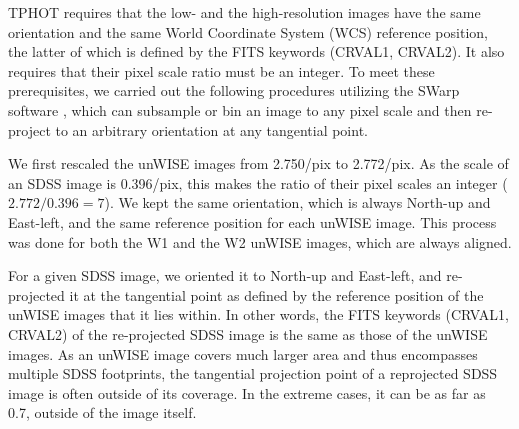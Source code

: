 \documentclass[numberedappendix,apj,twocolumn]{emulateapj}
\begin{document}

TPHOT requires that the low- and the high-resolution images have the same orientation and the same World Coordinate System (WCS) reference position, the latter of which is defined by the FITS keywords (CRVAL1, CRVAL2). %
It also requires that their pixel scale ratio must be an integer. To meet these prerequisites, we carried out the following procedures utilizing the SWarp software \citep[][]{Bertin2002}, which can subsample or bin an image to any pixel scale and then re-project to an arbitrary orientation at any tangential point.

We first rescaled the unWISE images from 2.750\arcsec/pix to 2.772\arcsec/pix. As the scale of an SDSS image is 0.396\arcsec/pix, this makes the ratio of their pixel scales an integer ($2.772/0.396=7$). We kept the same orientation, which is always North-up and East-left, and the same reference position for each unWISE image. This process was done for both the W1 and the W2 unWISE images, which are always aligned.

For a given SDSS image, we oriented it to North-up and East-left, and re-projected it at the tangential point as defined by the reference position of the unWISE images that it lies within. In other words, the FITS keywords (CRVAL1, CRVAL2) of the re-projected SDSS image is the same as those of the unWISE images. As an unWISE image covers much larger area and thus encompasses multiple SDSS footprints, the tangential projection point of a reprojected SDSS image is often outside of its coverage. In the extreme cases, it can be as far as 0.7\degree, outside of the image itself.
\end{document}
